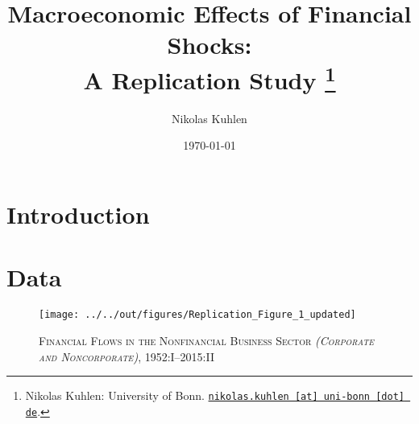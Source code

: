\documentclass[12pt,a4paper,leqno]{article}
\begin{document}
\title{Macroeconomic Effects of Financial Shocks: \\A Replication Study
\thanks{Nikolas Kuhlen: University of Bonn. \href{mailto:nikolas.kuhlen@uni-bonn.de} {\nolinkurl{nikolas.kuhlen [at] uni-bonn [dot] de}}.}
}

\author{Nikolas Kuhlen
}

\date{\today}

\maketitle


\clearpage

\section{Introduction}
\label{sec:introduction}

\newpage
\section{Data}
\label{sec:data}


\begin{figure}
    
    \centering

    \texttt{[image: ../../out/figures/Replication\_Figure\_1\_updated]}

    \caption{\textsc{Financial Flows in the Nonfinancial Business Sector \textit{(Corporate and Noncorporate)}}, 1952:I--2015:II}
    
    \label{fig:figure_1}

\end{figure}
\end{document}
